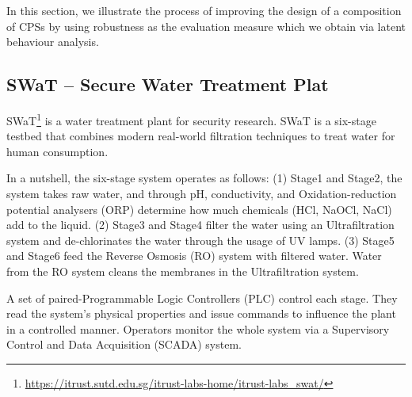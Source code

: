 {{%
In this section, we illustrate the process of improving the design of a composition of CPSs by using robustness as the evaluation measure which we obtain via latent behaviour analysis.
\subsection{SWaT -- Secure Water Treatment Plat}

SWaT\footnote{\url{https://itrust.sutd.edu.sg/itrust-labs-home/itrust-labs_swat/}} is a water treatment plant for security research. SWaT is a six-stage testbed that combines modern real-world filtration techniques to treat water for human consumption. 

In a nutshell, the six-stage system operates as follows:
(1) Stage1 and Stage2, the system takes raw water, and through pH, conductivity, and Oxidation-reduction potential analysers (ORP) determine how much chemicals (HCl, NaOCl, NaCl) add to the liquid. 
(2) Stage3 and Stage4 filter the water using an Ultrafiltration system and de-chlorinates the water through the usage of UV lamps. 
(3) Stage5 and Stage6 feed the Reverse Osmosis (RO) system with filtered water. Water from the RO system cleans the membranes in the Ultrafiltration system. 

{%
A set of paired-Programmable Logic Controllers (PLC) control each stage. 
They read the system's physical properties and issue commands to influence the plant in a controlled manner. 
Operators monitor the whole system via a Supervisory Control and Data Acquisition (SCADA) system.

}}}
